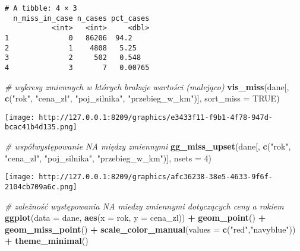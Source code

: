 \documentclass[
]{article}
\newenvironment{Shaded}{\begin{snugshade}}{\end{snugshade}}
\newcommand{\AttributeTok}[1]{\textcolor[rgb]{0.13,0.29,0.53}{#1}}
\newcommand{\CommentTok}[1]{\textcolor[rgb]{0.56,0.35,0.01}{\textit{#1}}}
\newcommand{\ConstantTok}[1]{\textcolor[rgb]{0.56,0.35,0.01}{#1}}
\newcommand{\DecValTok}[1]{\textcolor[rgb]{0.00,0.00,0.81}{#1}}
\newcommand{\FunctionTok}[1]{\textcolor[rgb]{0.13,0.29,0.53}{\textbf{#1}}}
\newcommand{\NormalTok}[1]{#1}
\newcommand{\SpecialCharTok}[1]{\textcolor[rgb]{0.81,0.36,0.00}{\textbf{#1}}}
\newcommand{\StringTok}[1]{\textcolor[rgb]{0.31,0.60,0.02}{#1}}
\begin{document}
\begin{verbatim}
# A tibble: 4 × 3
  n_miss_in_case n_cases pct_cases
           <int>   <int>     <dbl>
1              0   86206  94.2    
2              1    4808   5.25   
3              2     502   0.548  
4              3       7   0.00765
\end{verbatim}

\begin{Shaded}
\begin{Highlighting}[]
\CommentTok{\# wykresy zmiennych w których brakuje wartości (malejąco)}
\FunctionTok{vis\_miss}\NormalTok{(dane[, }\FunctionTok{c}\NormalTok{(}\StringTok{"rok"}\NormalTok{, }\StringTok{"cena\_zl"}\NormalTok{, }\StringTok{"poj\_silnika"}\NormalTok{, }\StringTok{"przebieg\_w\_km"}\NormalTok{)], }\AttributeTok{sort\_miss =} \ConstantTok{TRUE}\NormalTok{)}
\end{Highlighting}
\end{Shaded}

\texttt{[image: http://127.0.0.1:8209/graphics/e3433f11-f9b1-4f78-947d-bcac41b4d135.png]}

\begin{Shaded}
\begin{Highlighting}[]
\CommentTok{\# współwystępowanie NA między zmiennymi}
\FunctionTok{gg\_miss\_upset}\NormalTok{(dane[, }\FunctionTok{c}\NormalTok{(}\StringTok{"rok"}\NormalTok{, }\StringTok{"cena\_zl"}\NormalTok{, }\StringTok{"poj\_silnika"}\NormalTok{, }\StringTok{"przebieg\_w\_km"}\NormalTok{)], }
              \AttributeTok{nsets =} \DecValTok{4}\NormalTok{)}
\end{Highlighting}
\end{Shaded}

\texttt{[image: http://127.0.0.1:8209/graphics/afc36238-38e5-4633-9f6f-2104cb709a6c.png]}

\begin{Shaded}
\begin{Highlighting}[]
\CommentTok{\# zależność występowania NA miedzy zmiennymi dotyczących ceny a rokiem }
\FunctionTok{ggplot}\NormalTok{(}\AttributeTok{data =}\NormalTok{ dane, }\FunctionTok{aes}\NormalTok{(}\AttributeTok{x =}\NormalTok{ rok, }\AttributeTok{y =}\NormalTok{ cena\_zl)) }\SpecialCharTok{+} 
  \FunctionTok{geom\_point}\NormalTok{() }\SpecialCharTok{+}
  \FunctionTok{geom\_miss\_point}\NormalTok{() }\SpecialCharTok{+}
  \FunctionTok{scale\_color\_manual}\NormalTok{(}\AttributeTok{values =} \FunctionTok{c}\NormalTok{(}\StringTok{"red"}\NormalTok{,}\StringTok{"navyblue"}\NormalTok{)) }\SpecialCharTok{+}
  \FunctionTok{theme\_minimal}\NormalTok{()}
\end{Highlighting}
\end{Shaded}
\end{document}
